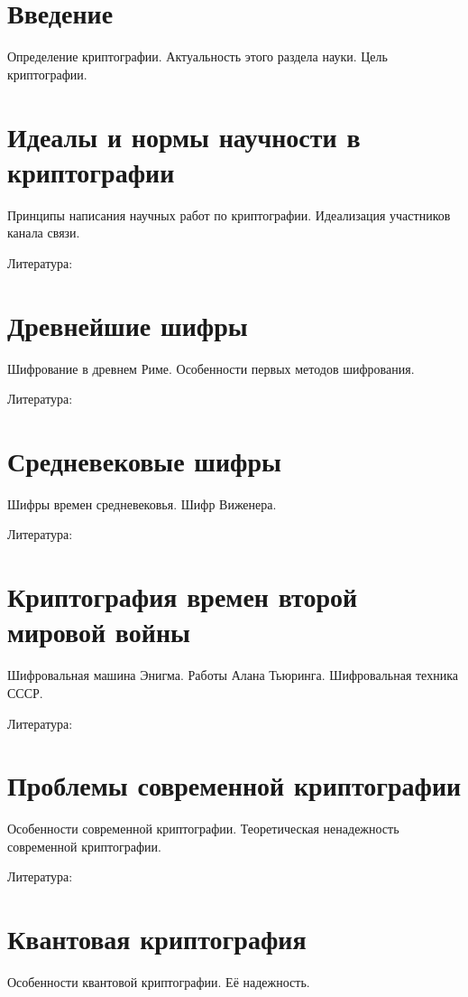 





\section*{Введение}
Определение криптографии. Актуальность этого раздела науки. Цель криптографии.

\section{Идеалы и нормы научности в криптографии}
Принципы написания научных работ по криптографии. Идеализация участников канала связи.

Литература: \cite{phil2016nesm, scarani2004quantum}

\section{Древнейшие шифры}
Шифрование в древнем Риме. Особенности первых методов шифрования. 

Литература: \cite{senthil2013modern}

\section{Средневековые шифры}
Шифры времен средневековья. Шифр Виженера. 

Литература: \cite{omran2011cryptanalytic}

\section{Криптография времен второй мировой войны}
Шифровальная машина Энигма. Работы Алана Тьюринга. Шифровальная техника СССР.

Литература: \cite{d2006sov, g2005n, hodges2014alan}


\section{Проблемы современной криптографии}
Особенности современной криптографии. Теоретическая ненадежность современной криптографии.

Литература: \cite{bellare2005introduction}

\section{Квантовая криптография}
Особенности квантовой криптографии. Её надежность.

